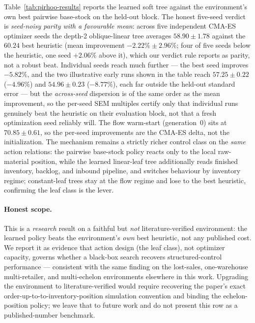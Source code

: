 \documentclass[11pt]{article}
\begin{document}
Table~\ref{tab:pirhoo-results} reports the learned soft tree against the environment's own best
pairwise base-stock on the held-out block. The honest five-seed verdict is \emph{seed-noisy parity
with a favourable mean}: across five independent CMA-ES optimizer seeds the depth-2 oblique-linear
tree averages $58.90\pm1.78$ against the $60.24$ best heuristic (mean improvement $-2.22\%\pm2.96\%$;
four of five seeds below the heuristic, one seed $+2.06\%$ above it), which our verdict rule reports
as parity, not a robust beat. Individual seeds reach much further --- the best seed improves
$-5.82\%$, and the two illustrative early runs shown in the table reach $57.25\pm0.22$ ($-4.96\%$)
and $54.96\pm0.23$ ($-8.77\%$), each far outside the held-out standard error --- but the
\emph{across-seed} dispersion is of the same order as the mean improvement, so the per-seed SEM
multiples certify only that individual runs genuinely beat the heuristic on their evaluation block,
not that a fresh optimization seed reliably will. The flow warm-start (generation~0) sits at
$70.85\pm0.61$, so the per-seed improvements are the CMA-ES delta, not the initialization. The
mechanism remains a strictly richer control class on the \emph{same}
action relations: the pairwise base-stock policy reacts only to the local raw-material position, while
the learned linear-leaf tree additionally reads finished inventory, backlog, and inbound pipeline, and
switches behaviour by inventory regime; constant-leaf trees stay at the flow regime and lose to the
best heuristic, confirming the leaf class is the lever.

\paragraph{Honest scope.}
This is a \emph{research} result on a faithful but \emph{not} literature-verified environment: the
learned policy beats the environment's \emph{own} best heuristic, not any published cost. We report it
as evidence that action design (the leaf class), not optimizer capacity, governs whether a black-box
search recovers structured-control performance --- consistent with the same finding on the lost-sales,
one-warehouse multi-retailer, and multi-echelon environments elsewhere in this work. Upgrading the
environment to literature-verified would require recovering the paper's exact order-up-to-to-inventory-position
simulation convention and binding the echelon-position policy; we leave
that to future work and do not present this row as a published-number benchmark.
\end{document}
